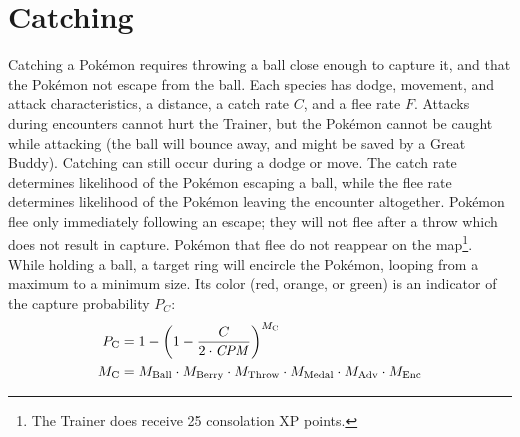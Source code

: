 \section{Catching\label{sec:catch}}
Catching a Pokémon requires throwing a ball close enough to capture it,
 and that the Pokémon not escape from the ball.
Each species has dodge, movement, and attack characteristics, a distance, a catch rate $C$, and a flee rate $F$.
Attacks during encounters cannot hurt the Trainer, but the Pokémon cannot be caught
  while attacking (the ball will bounce away, and might be saved by a Great Buddy).
Catching can still occur during a dodge or move.
The catch rate determines likelihood of the Pokémon escaping a ball,
  while the flee rate determines likelihood of the Pokémon leaving the encounter altogether.
Pokémon flee only immediately following an escape; they will not flee after a throw which
  does not result in capture.
Pokémon that flee do not reappear on the map\footnote{The Trainer does receive 25 consolation XP points.}.
While holding a ball, a target ring will encircle the Pokémon, looping from a maximum to a minimum size.
Its color (red, orange, or green) is an indicator of the capture probability $P_C$:
\begin{align*}
  P_\mathrm{C} &= 1-\left(1 - \frac{C}{2\cdot{}\mbox{$\mathit{CPM}$}}\right)^{M_\mathrm{C}}\\
  M_\mathrm{C} &= M_\mathrm{Ball} \cdot M_\mathrm{Berry} \cdot M_\mathrm{Throw} \cdot M_\mathrm{Medal} \cdot M_\mathrm{Adv} \cdot M_\mathrm{Enc}
\end{align*}
